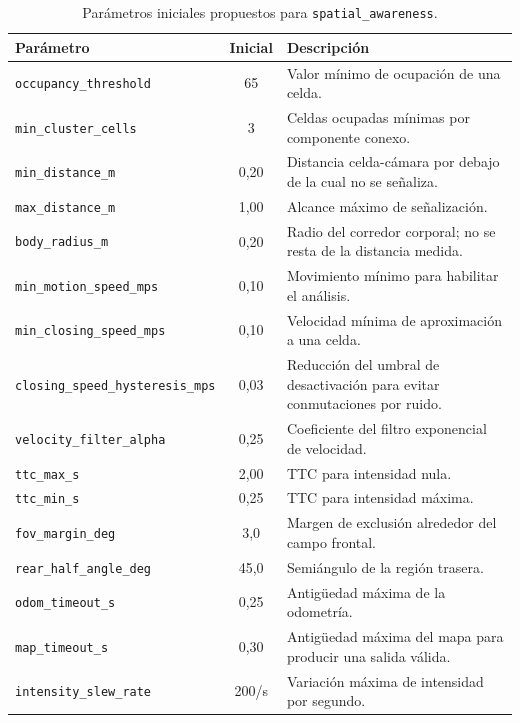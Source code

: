 \begin{table}[ht]
  \centering
  \caption{Parámetros iniciales propuestos para
  \texttt{spatial\_awareness}.}
  \label{tab:sa-parameters}
  \small
  \begin{tabular}{lcp{7cm}}
    \hline
    \textbf{Parámetro} & \textbf{Inicial} & \textbf{Descripción} \\
    \hline
    \texttt{occupancy\_threshold} & 65 &
      Valor mínimo de ocupación de una celda. \\
    \texttt{min\_cluster\_cells} & 3 &
      Celdas ocupadas mínimas por componente conexo. \\
    \texttt{min\_distance\_m} & 0,20 &
      Distancia celda-cámara por debajo de la cual no se señaliza. \\
    \texttt{max\_distance\_m} & 1,00 &
      Alcance máximo de señalización. \\
    \texttt{body\_radius\_m} & 0,20 &
      Radio del corredor corporal; no se resta de la distancia medida. \\
    \texttt{min\_motion\_speed\_mps} & 0,10 &
      Movimiento mínimo para habilitar el análisis. \\
    \texttt{min\_closing\_speed\_mps} & 0,10 &
      Velocidad mínima de aproximación a una celda. \\
    \texttt{closing\_speed\_hysteresis\_mps} & 0,03 &
      Reducción del umbral de desactivación para evitar conmutaciones por ruido. \\
    \texttt{velocity\_filter\_alpha} & 0,25 &
      Coeficiente del filtro exponencial de velocidad. \\
    \texttt{ttc\_max\_s} & 2,00 &
      TTC para intensidad nula. \\
    \texttt{ttc\_min\_s} & 0,25 &
      TTC para intensidad máxima. \\
    \texttt{fov\_margin\_deg} & 3,0 &
      Margen de exclusión alrededor del campo frontal. \\
    \texttt{rear\_half\_angle\_deg} & 45,0 &
      Semiángulo de la región trasera. \\
    \texttt{odom\_timeout\_s} & 0,25 &
      Antigüedad máxima de la odometría. \\
    \texttt{map\_timeout\_s} & 0,30 &
      Antigüedad máxima del mapa para producir una salida válida. \\
    \texttt{intensity\_slew\_rate} & 200/s &
      Variación máxima de intensidad por segundo. \\
    \hline
  \end{tabular}
\end{table}

